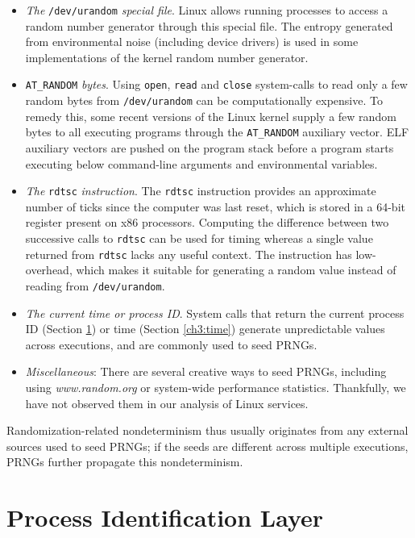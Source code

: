 \begin{itemize}
\item {\em The} \texttt{/dev/urandom} {\em special file}. Linux allows
running processes to access a random number generator through this
special file. The entropy generated from environmental noise (including
device drivers) is used in some implementations of the kernel random number generator.
\newpage
\item \texttt{AT\_RANDOM} {\em bytes}.
Using \texttt{open}, \texttt{read} and \texttt{close} system-calls 
to read only a few random bytes from \texttt{/dev/urandom} 
can be computationally expensive. 
To remedy this, some 
recent versions of the Linux kernel supply
a few random bytes to all executing programs
through the \texttt{AT\_RANDOM} auxiliary vector.
ELF auxiliary vectors are pushed on the program
stack before a program starts executing below command-line arguments and environmental
variables.

\item {\em The} \texttt{rdtsc} {\em instruction}.
The \texttt{rdtsc} instruction provides an approximate number of ticks since
the computer was last reset, which is stored in a 64-bit register present
on x86 processors. Computing the difference between two successive
calls to \texttt{rdtsc} can be used for timing whereas a single
value returned from \texttt{rdtsc} lacks any useful context.  
The instruction has low-overhead, which makes it suitable for generating a random value
instead of reading from \texttt{/dev/urandom}. 

\item {\em The current time or process ID}. 
System calls that return the current
process ID (Section \ref{ch3:pid}) or time (Section \ref{ch3:time})
generate unpredictable values across
executions, and are commonly used to seed PRNGs.

\item {\em Miscellaneous}: There
are several creative ways to seed PRNGs, including 
using {\em www.random.org}
or system-wide performance statistics.
Thankfully, we have not observed them 
in our analysis of Linux services.
\end{itemize}

Randomization-related nondeterminism thus usually originates from
any external sources used to seed PRNGs;
if the seeds are different across multiple
executions, PRNGs further propagate this
nondeterminism.

\section{Process Identification Layer} \label{ch3:pid}

